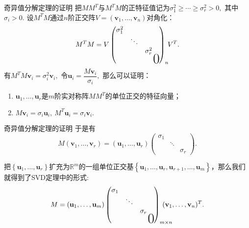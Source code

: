 
\begin{frame}

\begin{block}{奇异值分解定理的证明}
把$MM^T$与$M^TM$的正特征值记为$\sigma_1^2 \geqslant \cdots \geqslant \sigma_r^2 > 0,$ 其中$\sigma_i>0.$ 设$M^TM$通过$n$阶正交阵$V = (\mathbf{v}_1,\ldots,\mathbf{v}_n)$对角化：
$$M^TM = V \begin{pmatrix}
\sigma_1^2 & & & \\ & \ddots & & \\ & & \sigma_r^2 & \\ & & & \bigzero \end{pmatrix}_n\!\! V^T.$$
有$M^TM\mathbf{v}_i = \sigma_i^2\mathbf{v}_i,$ 令$\mathbf{u}_i = \dfrac{M\mathbf{v}_i}{\sigma_i},$ 那么可以证明：

\pause

\begin{enumerate}
\item $\mathbf{u}_1, \ldots, \mathbf{u}_r$是$m$阶实对称阵$MM^T$的单位正交的特征向量；
\item $M\mathbf{v}_i = \sigma_i\mathbf{u}_i, \ M^T\mathbf{u}_i = \sigma_i\mathbf{v}_i.$
\end{enumerate}
\end{block}

\end{frame}


\begin{frame}

\begin{block}{奇异值分解定理的证明}
于是有
$$M(\mathbf{v}_1,\ldots,\mathbf{v}_r) = (\mathbf{u}_1,\ldots,\mathbf{u}_r) \begin{pmatrix}
\sigma_1 & & \\ & \ddots & \\ & & \sigma_r \end{pmatrix}.$$

\pause

把$\left\{ \mathbf{u}_1,\ldots,\mathbf{u}_r \right\}$扩充为$\mathbb{R}^m$的一组单位正交基$\left\{ \mathbf{u}_1,\ldots,\mathbf{u}_r,  \mathbf{u}_{r+1},\ldots,\mathbf{u}_m \right\}$，那么我们就得到了SVD定理中的形式:
$$M = (\mathbf{u}_1,\ldots,\mathbf{u}_m) \begin{pmatrix}
\sigma_1 & & & \\ & \ddots & & \\ & & \sigma_r & \\ & & & \bigzero \end{pmatrix}_{m\times n}\!\!\!\!\!\!\!\!\!\!(\mathbf{v}_1,\ldots,\mathbf{v}_n)^T.$$
\end{block}

\end{frame}

